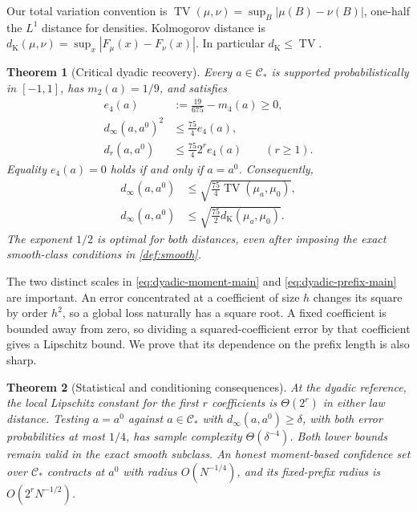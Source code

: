 \documentclass[11pt,a4paper]{article}
\numberwithin{equation}{section}
\newtheorem{theorem}{Theorem}[section]
\theoremstyle{definition}
\theoremstyle{remark}
\DeclareMathOperator{\TV}{TV}
\newcommand{\C}{\mathcal C}
\newcommand{\dK}{d_{\mathrm K}}
\begin{document}
Our total variation convention is
$\TV(\mu,\nu)=\sup_B|\mu(B)-\nu(B)|$, one-half the $L^1$ distance for
densities. Kolmogorov distance is
$\dK(\mu,\nu)=\sup_x|F_\mu(x)-F_\nu(x)|$.
In particular $\dK\le\TV$.

\begin{theorem}[Critical dyadic recovery]
\label{thm:dyadic-intro}
Every $a\in\C_*$ is supported probabilistically in $[-1,1]$, has
$m_2(a)=1/9$, and satisfies
\begin{align}
 e_4(a)&:=\frac{19}{675}-m_4(a)\ge0, \label{eq:e4-dyadic}\\
 d_\infty(a,a^0)^2&\le\frac{75}{4}e_4(a), \label{eq:dyadic-moment-main}\\
 d_r(a,a^0)&\le\frac{75}{4}2^r e_4(a)\qquad(r\ge1).
 \label{eq:dyadic-prefix-main}
\end{align}
Equality $e_4(a)=0$ holds if and only if $a=a^0$. Consequently,
\begin{align}
 d_\infty(a,a^0)&\le\sqrt{\tfrac{75}{4}\TV(\mu_a,\mu_0)},
 \label{eq:dyadic-TV-main}\\
 d_\infty(a,a^0)&\le\sqrt{\tfrac{75}{2}\dK(\mu_a,\mu_0)}.
 \label{eq:dyadic-K-main}
\end{align}
The exponent $1/2$ is optimal for both distances, even after imposing the
exact smooth-class conditions in \cref{def:smooth}.
\end{theorem}

The two distinct scales in \eqref{eq:dyadic-moment-main} and
\eqref{eq:dyadic-prefix-main} are important. An error concentrated at a
coefficient of size $h$ changes its square by order $h^2$, so a global loss
naturally has a square root. A fixed coefficient is bounded away from zero,
so dividing a squared-coefficient error by that coefficient gives a Lipschitz
bound. We prove that its dependence on the prefix length is also sharp.

\begin{theorem}[Statistical and conditioning consequences]
\label{thm:stat-intro}
At the dyadic reference, the local Lipschitz constant for the first $r$
coefficients is $\Theta(2^r)$ in either law distance. Testing
$a=a^0$ against $a\in\C_*$ with $d_\infty(a,a^0)\ge\delta$, with both
error probabilities at most $1/4$, has sample complexity
$\Theta(\delta^{-4})$. Both lower bounds remain valid in the exact smooth
subclass. An honest moment-based confidence set over $\C_*$ contracts at
$a^0$ with radius $O(N^{-1/4})$, and its fixed-prefix radius is
$O(2^rN^{-1/2})$.
\end{theorem}
\end{document}
